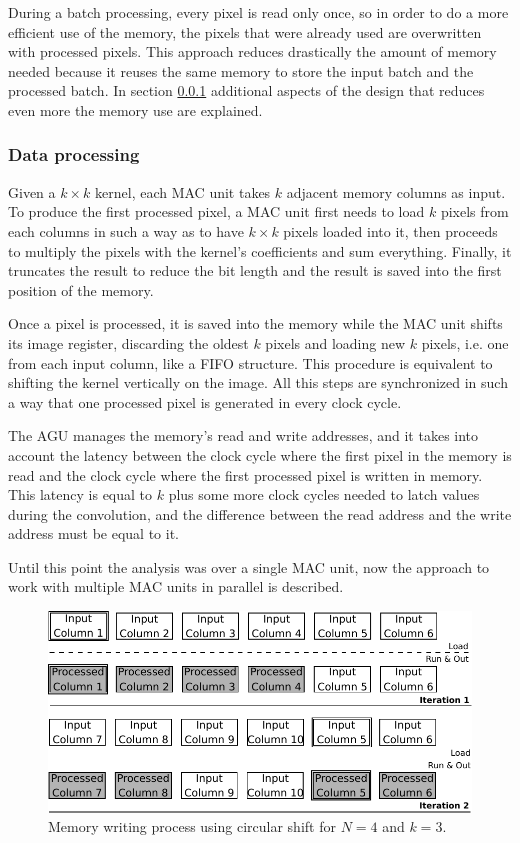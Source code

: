 \documentclass[conference,compsoc]{IEEEtran}
\begin{document}
During a batch processing, every pixel is read only once, so in order to do a
more efficient use of the memory, the pixels that were already used are
overwritten with processed pixels. This approach reduces drastically the amount
of memory needed because it reuses the same memory to store the input batch and the
processed batch. In section \ref{dataproc} additional aspects of the design
that reduces even more the memory use are explained.

\subsubsection{Data processing}\label{dataproc}
Given a $k\times k$ kernel, each MAC unit takes $k$ adjacent memory columns as
input. To produce the first processed pixel, a MAC unit first needs to
load $k$ pixels from each columns in such a way as to have $k\times
k$ pixels loaded into it, then proceeds to multiply the pixels with the kernel's
coefficients and sum everything. Finally, it truncates the result to reduce the
bit length and the result is saved into the first position of the memory.

Once a pixel is processed, it is saved into the memory while the MAC unit
shifts its image register, discarding the oldest $k$ pixels and loading new $k$
pixels, i.e. one from each input column, like a FIFO structure.
This procedure is equivalent to shifting the kernel vertically on the image. All this steps are synchronized in such a way that
one processed pixel is generated in every clock cycle.

The AGU manages the memory's read and write addresses, and it takes into account the
latency between the clock cycle where the first pixel in the memory is read and
the clock cycle where the first processed pixel is written in memory. This latency is
equal to $k$ plus some more clock cycles needed to latch values during the
convolution, and the difference between the read address and the write address
must be equal to it.

Until this point the analysis was over a single MAC unit, now the
approach to work with multiple MAC units in parallel is
described.

\begin{figure}[!t]
\centering
\includegraphics[scale=0.55]{algorithm}
\caption{Memory writing process using circular shift for $N = 4$ and $k = 3$.}
\label{algorithm}
\end{figure}
\end{document}
